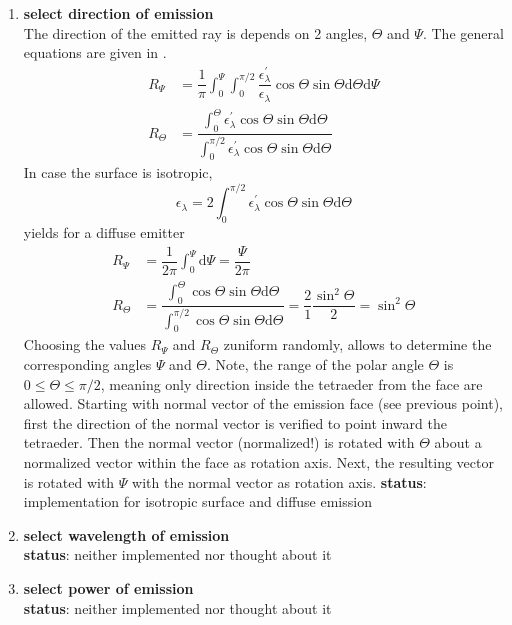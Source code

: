 \documentclass[a4paper,10pt]{scrartcl}
\begin{document}
\begin{enumerate}
 \item \textbf{select direction of emission} \\
       The direction of the emitted ray is depends on 2 angles, $\Theta$ and $\Psi$. The general equations are given in \cite[p.~653f.]{Mod03}. 
       \begin{align}
        R_\Psi & = \dfrac{1}{\pi} \int_0^\Psi \int_0^{\pi/2} \dfrac{\epsilon^\prime_\lambda}{\epsilon_\lambda} \cos \Theta \sin \Theta \mathrm{d} \Theta \mathrm{d} \Psi \\
        R_\Theta & = \dfrac{\int_0^\Theta \epsilon^\prime_\lambda \cos \Theta \sin \Theta \mathrm{d} \Theta}{\int_0^{\pi/2} \epsilon^\prime_\lambda \cos \Theta \sin \Theta \mathrm{d} \Theta} 
       \end{align}
       In case the surface is isotropic, 
       \begin{equation}
        \epsilon_\lambda = 2 \int_0^{\pi/2} \epsilon^\prime_\lambda \cos \Theta \sin \Theta \mathrm{d}\Theta
       \end{equation}
       yields for a diffuse emitter
       \begin{align}
        R_\Psi & = \dfrac{1}{2\pi} \int_0^\Psi \mathrm{d} \Psi = \dfrac{\Psi}{2 \pi} \\
        R_\Theta & = \dfrac{\int_0^\Theta \cos \Theta \sin \Theta \mathrm{d} \Theta}{\int_0^{\pi/2} \cos \Theta \sin \Theta \mathrm{d} \Theta} = \dfrac{2}{1} \dfrac{\sin^2 \Theta}{2} = \sin^2 \Theta
       \end{align}
       Choosing the values $R_\Psi$ and $R_\Theta$ zuniform randomly, allows to determine the corresponding angles $\Psi$ and $\Theta$. Note, the range of the polar angle $\Theta$ is $0 \le \Theta \le \pi/2$, meaning only direction inside the tetraeder from the face are allowed. Starting with normal vector of the emission face (see previous point), first the direction of the normal vector is verified to point inward the tetraeder. Then the normal vector (normalized!) is rotated with $\Theta$ about a normalized vector within the face as rotation axis. Next, the resulting vector is rotated with $\Psi$ with the normal vector as rotation axis.
       \textbf{status}: implementation for isotropic surface and diffuse emission

 \item \textbf{select wavelength of emission} \\
       \textbf{status}: neither implemented nor thought about it
 \item \textbf{select power of emission} \\
       \textbf{status}: neither implemented nor thought about it
\end{enumerate}
\end{document}
